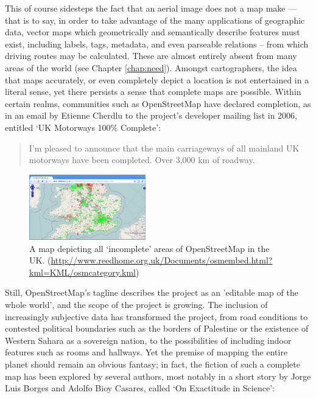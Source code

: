 \documentclass[11pt]{report}
\begin{document}
This of course sidesteps the fact that an aerial image does not a map make --- that is to say, in order to take advantage of the many applications of geographic data, vector maps which geometrically and semantically describe features must exist, including labels, tags, metadata, and even parseable relations -- from which driving routes may be calculated. These are almost entirely absent from many areas of the world (see Chapter \ref{chap:need}). Amongst cartographers, the idea that maps accurately, or even completely depict a location is not entertained in a literal sense, yet there persists a sense that complete maps are possible. Within certain realms, communities such as OpenStreetMap have declared completion, as in an email by Etienne Cherdlu to the project's developer mailing list in 2006, entitled `UK Motorways 100\% Complete': \begin{quote}I'm pleased to announce that the main carriageways of all mainland UK motorways have been completed. Over 3,000 km of roadway.\end{quote}

\begin{figure}
	\begin{flushright}
		\includegraphics[width=0.45\textwidth]{images/osm-missing-parts.png}
	\caption{A map depicting all `incomplete' areas of OpenStreetMap in the UK. (\url{http://www.reedhome.org.uk/Documents/osmembed.html?kml=KML/osmcategory.kml})}
	\end{flushright}
\end{figure}

Still, OpenStreetMap's tagline describes the project as an 'editable map of the whole world', and the scope of the project is growing. The inclusion of increasingly subjective data has transformed the project, from road conditions to contested political boundaries such as the borders of Palestine or the existence of Western Sahara as a sovereign nation, to the possibilities of including indoor features such as rooms and hallways. Yet the premise of mapping the entire planet should remain an obvious fantasy; in fact, the fiction of such a complete map has been explored by several authors, most notably in a short story by Jorge Luis Borges and Adolfo Bioy Casares, called `On Exactitude in Science':
\end{document}
